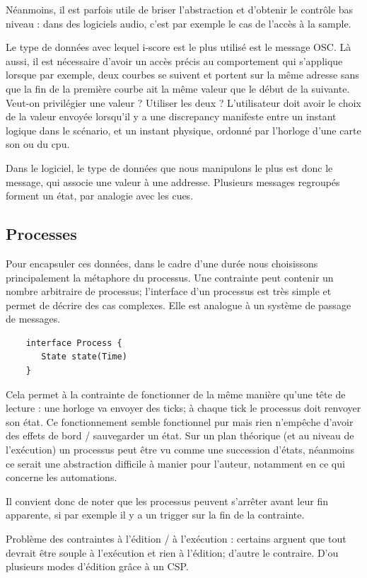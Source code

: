 \documentclass{sigchi}
\begin{document}
Néanmoins, il est parfois utile de briser l'abstraction et d'obtenir le contrôle bas niveau : dans des logiciels audio, c'est par exemple le cas de l'accès à la sample.

Le type de données avec lequel i-score est le plus utilisé est le message OSC. Là aussi, il est nécessaire d'avoir un accès précis au comportement qui s'applique lorsque par exemple, deux courbes se suivent et portent sur la même adresse sans que la fin de la première courbe ait la même valeur que le début de la suivante. Veut-on privilégier une valeur ? Utiliser les deux ? L'utilisateur doit avoir le choix de la valeur envoyée lorsqu'il y a une discrepancy manifeste entre un instant logique dans le scénario, et un instant physique, ordonné par l'horloge d'une carte son ou du cpu.

Dans le logiciel, le type de données que nous manipulons le plus est donc le message, qui associe une valeur à une addresse. Plusieurs messages regroupés forment un état, par analogie avec les cues.

\subsection{Processes}
Pour encapsuler ces données, dans le cadre d'une durée nous choisissons principalement la métaphore du processus. Une contrainte peut contenir un nombre arbitraire de processus; l'interface d'un processus est très simple et permet de décrire des cas complexes. Elle est analogue à un système de passage de messages.

\begin{lstlisting}
    interface Process {
       State state(Time)
    }
\end{lstlisting}

Cela permet à la contrainte de fonctionner de la même manière qu'une tête de lecture : une horloge va envoyer des ticks; à chaque tick le processus doit renvoyer son état. Ce fonctionnement semble fonctionnel pur mais rien n'empêche d'avoir des effets de bord / sauvegarder un état.
Sur un plan théorique (et au niveau de l'exécution) un processus peut être vu comme une succession d'états, néanmoins ce serait une abstraction difficile à manier pour l'auteur, notamment en ce qui concerne les automations.

Il convient donc de noter que les processus peuvent s'arrêter avant leur fin apparente, si par exemple il y a un trigger sur la fin de la contrainte.

Problème des contraintes à l'édition / à l'exécution : certains arguent que tout devrait être souple à l'exécution et rien à l'édition; d'autre le contraire. D'ou plusieurs modes d'édition grâce à un CSP.
\end{document}
